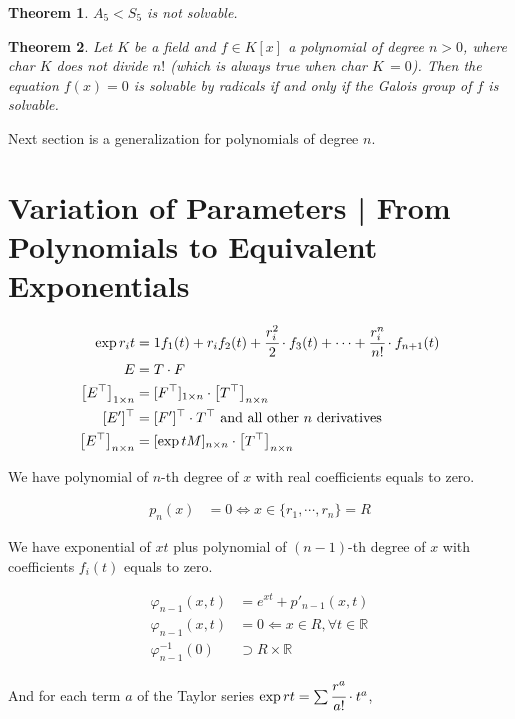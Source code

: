 \documentclass[12pt,a4paper]{article}
\newtheorem{thm}{Theorem}[section]
\begin{document}
\begin{thm}
$A_5 < S_5$ is not solvable.
\end{thm}

\begin{thm}
Let $K$ be a field and $f \in K[x]$ a polynomial of degree $n > 0$, where char $K$ does not divide $n!$ (which is always true when char $K\,= 0$). Then the equation $f(x) = 0$ is solvable by radicals if and only if the Galois group of $f$ is solvable.
\end{thm}

Next section is a generalization for polynomials of degree $n$.

\section{Variation of Parameters | From Polynomials to Equivalent Exponentials}

\begin{align}
\exp r_i t &= 1 f_1(t) + r_i f_2(t) + \cfrac{r_i^2}{2}\cdot f_3(t) + \cdots + \cfrac{r_i^n}{n!}\cdot f_{n + 1}(t) \\
E &= T\cdot F \\
\left[E^\top \right]_{1 \times n} &= [F^\top]_{1 \times n} \cdot \left[T^\top \right]_{n \times n} \\
[E']^\top &= [F']^\top\cdot T^\top \text{ and all other }n\text{ derivatives} \\
\left[E^\top \right]_{n \times n} &= [\exp tM]_{n \times n} \cdot \left[T^\top \right]_{n \times n}
\end{align}

We have polynomial of $n$-th degree of $x$ with real coefficients equals to zero.

\begin{align}
p_n(x) &= 0 \Leftrightarrow x \in \{ r_1, \cdots, r_n \} = R
\end{align}

We have exponential of $xt$ plus polynomial of $(n-1)$-th degree of $x$ with coefficients $f_i(t)$ equals to zero.

\begin{align}
\varphi_{n - 1}(x, t) &= e^{xt} + p'_{n-1}(x, t) \\
\varphi_{n - 1}(x, t) &= 0 \Leftarrow x \in R, \forall t \in \mathbb{R} \\
\varphi_{n - 1}^{-1}(0) &\supset R \times \mathbb{R}
\end{align}

And for each term $a$ of the Taylor series $\exp rt = \sum \cfrac{r^a}{a!} \cdot t^a$,
\end{document}
